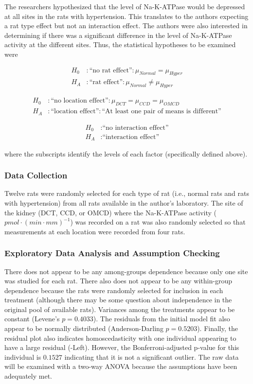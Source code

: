 \documentclass[10pt,openany]{book}\usepackage[]{graphicx}\usepackage[]{color}
\begin{document}
The researchers hypothesized that the level of Na-K-ATPase would be depressed at all sites in the rats with hypertension.  This translates to the authors expecting a rat type effect but not an interaction effect.  The authors were also interested in determining if there was a significant difference in the level of Na-K-ATPase activity at the different sites.  Thus, the statistical hypotheses to be examined were

\[ \begin{split}
   H_{0}&: \text{``no rat effect''}: \mu_{Normal} = \mu_{Hyper} \\
   H_{A}&: \text{``rat effect''}: \mu_{Normal} \neq \mu_{Hyper}
\end{split} \]

\[ \begin{split}
   H_{0}&: \text{``no location effect''}: \mu_{DCT} = \mu_{CCD} = \mu_{OMCD} \\
   H_{A}&: \text{``location effect''}: \text{``At least one pair of means is different''}
\end{split} \]

\[ \begin{split}
   H_{0}&: \text{``no interaction effect''} \\
   H_{A}&: \text{``interaction effect''}
\end{split} \]

where the subscripts identify the levels of each factor (specifically defined above).

\subsubsection*{Data Collection}
Twelve rats were randomly selected for each type of rat (i.e., normal rats and rats with hypertension) from all rats available in the author's laboratory.  The site of the kidney (DCT, CCD, or OMCD) where the Na-K-ATPase activity ($pmol\cdot(min\cdot mm)^{-1}$) was recorded on a rat was also randomly selected so that measurements at each location were recorded from four rats.

\subsubsection*{Exploratory Data Analysis and Assumption Checking}


There does not appear to be any among-groups dependence because only one site was studied for each rat.  There also does not appear to be any within-group dependence because the rats were randomly selected for inclusion in each treatment (although there may be some question about independence in the original pool of available rats).  Variances among the treatments appear to be constant (Levene's $p=0.4033$).  The residuals from the initial model fit also appear to be normally distributed (Anderson-Darling $p=0.5203$).  Finally, the residual plot also indicates homoscedasticity with one individual appearing to have a large residual (-Left).  However, the Bonferroni-adjusted p-value for this individual is $0.1527$ indicating that it is not a significant outlier.  The raw data will be examined with a two-way ANOVA because the assumptions have been adequately met.
\end{document}
